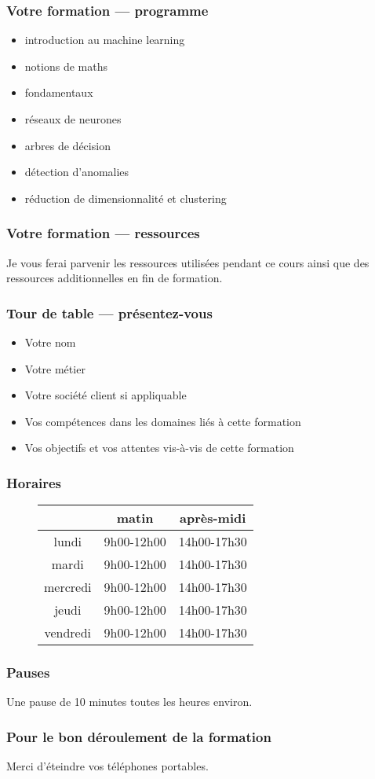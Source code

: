 \documentclass{formation}
\begin{document}
\begin{frame}
  \frametitle{Votre formation — programme}

  \begin{itemize}

  \item introduction au machine learning
  \item notions de maths
  \item fondamentaux
  \item réseaux de neurones
  \item arbres de décision
  \item détection d'anomalies
  \item réduction de dimensionnalité et clustering
  \end{itemize}
\end{frame}

\begin{frame}
  \frametitle{Votre formation — ressources}

  Je vous ferai parvenir les ressources utilisées pendant ce cours
  ainsi que des ressources additionnelles en fin de formation.
\end{frame}

\begin{frame}
  \frametitle{Tour de table — présentez-vous}

  \begin{itemize}
  \item Votre nom
  \item Votre métier
  \item Votre société client si appliquable
  \item Vos compétences dans les domaines liés à cette formation
  \item Vos objectifs et vos attentes vis-à-vis de cette formation
  \end{itemize}
\end{frame}

\begin{frame}
  \frametitle{Horaires}
  \begin{figure}
    \centering
    \begin{tabular}{ccc}
      \toprule
               & matin            & après-midi        \\ \midrule
      lundi    & 9h00-12h00       & 14h00-17h30       \\
      mardi    & 9h00-12h00       & 14h00-17h30       \\
      mercredi & 9h00-12h00       & 14h00-17h30       \\
      jeudi    & 9h00-12h00       & 14h00-17h30       \\
      vendredi & 9h00-12h00       & 14h00-17h30       \\
      \bottomrule
    \end{tabular}
  \end{figure}
\end{frame}

\begin{frame}
  \frametitle{Pauses}
  Une pause de 10 minutes toutes les heures environ.
\end{frame}

\begin{frame}
  \frametitle{Pour le bon déroulement de la formation}
  Merci d'éteindre vos téléphones portables.
\end{frame}
\end{document}
